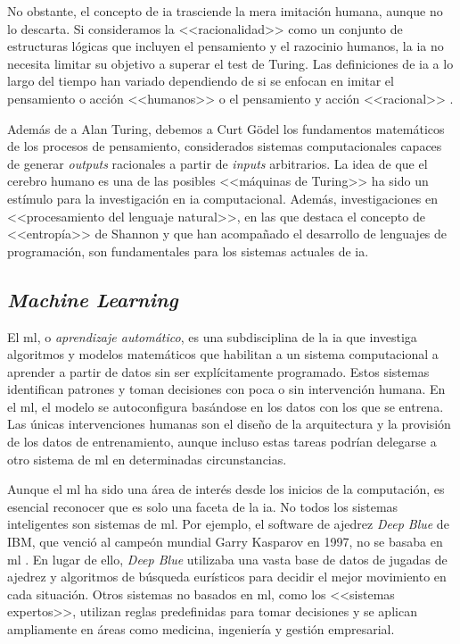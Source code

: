 No obstante, el concepto de \gls{ia} trasciende la mera imitación humana, aunque no lo descarta. Si consideramos la <<racionalidad>> como un conjunto de estructuras lógicas que incluyen el pensamiento y el razocinio humanos, la \gls{ia} no necesita limitar su objetivo a superar el test de Turing. Las definiciones de \gls{ia} a lo largo del tiempo han variado dependiendo de si se enfocan en imitar el pensamiento o acción <<humanos>> o el pensamiento y acción <<racional>> \citep{RussellStuartJ2021AI:A}.

Además de a Alan Turing, debemos a Curt Gödel los fundamentos matemáticos de los procesos de pensamiento, considerados sistemas computacionales capaces de generar \textit{outputs} racionales a partir de \textit{inputs} arbitrarios. La idea de que el cerebro humano es una de las posibles <<máquinas de Turing>> \citep{penroseNuevaMenteEmperador2015} ha sido un estímulo para la investigación en \gls{ia} computacional. Además, investigaciones en <<procesamiento del lenguaje natural>>, en las que destaca el concepto de <<entropía>> de Shannon \citep{shannon1951prediction} y que han acompañado el desarrollo de lenguajes de programación, son fundamentales para los sistemas actuales de \gls{ia}.


\subsection{\textit{Machine Learning}}

El \gls{ml}, o \textit{aprendizaje automático}, es una subdisciplina de la \gls{ia} que investiga algoritmos y modelos matemáticos que habilitan a un sistema computacional a aprender a partir de datos sin ser explícitamente programado. Estos sistemas identifican patrones y toman decisiones con poca o sin intervención humana. En el \gls{ml}, el modelo se autoconfigura basándose en los datos con los que se entrena. Las únicas intervenciones humanas son el diseño de la arquitectura y la provisión de los datos de entrenamiento, aunque incluso estas tareas podrían delegarse a otro sistema de \gls{ml} en determinadas circunstancias.

Aunque el \gls{ml} ha sido una área de interés desde los inicios de la computación, es esencial reconocer que es solo una faceta de la \gls{ia}. No todos los sistemas inteligentes son sistemas de \gls{ml}. Por ejemplo, el software de ajedrez \textit{Deep Blue} de IBM, que venció al campeón mundial Garry Kasparov en 1997, no se basaba en \gls{ml} \citep{campbellDeepBlue2002}. En lugar de ello, \textit{Deep Blue} utilizaba una vasta base de datos de jugadas de ajedrez y algoritmos de búsqueda eurísticos para decidir el mejor movimiento en cada situación. Otros sistemas no basados en \gls{ml}, como los <<sistemas expertos>>, utilizan reglas predefinidas para tomar decisiones y se aplican ampliamente en áreas como medicina, ingeniería y gestión empresarial.

